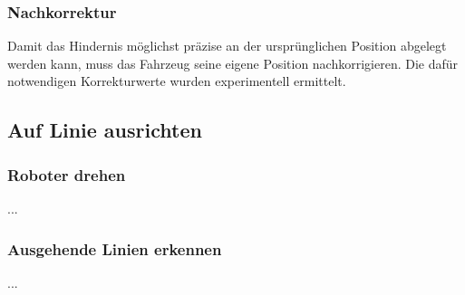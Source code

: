 \subsubsection{Nachkorrektur}
Damit das Hindernis möglichst präzise an der ursprünglichen Position abgelegt werden kann, muss das Fahrzeug seine eigene Position nachkorrigieren. Die dafür notwendigen Korrekturwerte wurden experimentell ermittelt.


\newpage
\subsection{Auf Linie ausrichten}

\subsubsection{Roboter drehen}

...

\subsubsection{Ausgehende Linien erkennen}
\label{outgoing-lines}

...